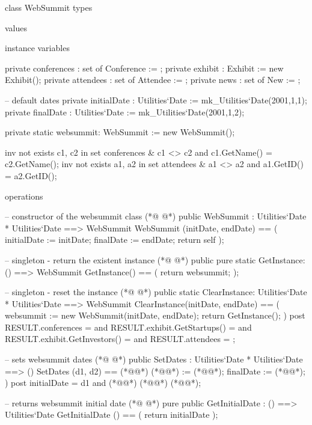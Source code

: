 \begin{vdmpp}[breaklines=true]
class WebSummit
types

values

instance variables

 private conferences : set of Conference := {};
 private exhibit : Exhibit := new Exhibit();
 private attendees : set of Attendee := {};
 private news : set of New := {};
 
 -- default dates
 private initialDate : Utilities`Date := mk_Utilities`Date(2001,1,1);
 private finalDate : Utilities`Date := mk_Utilities`Date(2001,1,2);
 
 private static websummit: WebSummit := new WebSummit();
 
 inv not exists c1, c2 in set conferences & c1 <> c2 and c1.GetName() = c2.GetName();
 inv not exists a1, a2 in set attendees & a1 <> a2 and a1.GetID() = a2.GetID();
 
operations

 -- constructor of the websummit class 
(*@
\label{WebSummit:25}
@*)
 public WebSummit :  Utilities`Date * Utilities`Date ==> WebSummit
    WebSummit (initDate, endDate) == (
     initialDate := initDate;
     finalDate := endDate;
     return self
    );
    
 -- singleton - return the existent instance
(*@
\label{GetInstance:33}
@*)
 public pure static GetInstance: () ==> WebSummit 
   GetInstance() == (
    return websummit;
   );
    
 -- singleton - reset the instance
(*@
\label{ClearInstance:39}
@*)
 public static ClearInstance: Utilities`Date * Utilities`Date ==> WebSummit
  ClearInstance(initDate, endDate) == (
   websummit := new WebSummit(initDate, endDate);
   return GetInstance();
  )
  post RESULT.conferences = {} and RESULT.exhibit.GetStartups() = {}
    and RESULT.exhibit.GetInvestors() = {} and RESULT.attendees = {};  
    
  -- sets websummit dates
(*@
\label{SetDates:48}
@*)
  public SetDates : Utilities`Date * Utilities`Date ==> ()
    SetDates (d1, d2) == (*@\vdmnotcovered{(}@*)
     (*@@*) := (*@@*);
     finalDate := (*@@*);
    )
    post initialDate = d1 and (*@@*) (*@\vdmnotcovered{=}@*) (*@@*);
    
  --  returns websummit initial date
(*@
\label{GetInitialDate:56}
@*)
  pure public GetInitialDate : () ==> Utilities`Date
    GetInitialDate () == (
     return initialDate
    );
    

\end{vdmpp}
